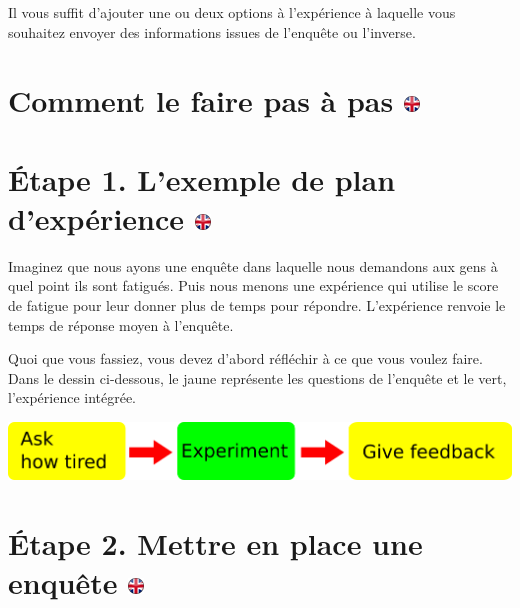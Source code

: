 \documentclass[
]{book}
\begin{document}
Il vous suffit d'ajouter une ou deux options à l'expérience à laquelle vous souhaitez envoyer des informations issues de l'enquête ou l'inverse.

\hypertarget{comment-le-faire-pas-uxe0-pas}{%
\section[Comment le faire pas à pas ]{\texorpdfstring{Comment le faire pas à pas \href{https://www.psytoolkit.org/lessons/var_in_out.html\#_how_to_do_it_step_by_step}{\protect\includegraphics{img/ukflag.png}}}{Comment le faire pas à pas }}\label{comment-le-faire-pas-uxe0-pas}}

\hypertarget{uxe9tape-1.-lexemple-de-plan-dexpuxe9rience}{%
\section[Étape 1. L'exemple de plan d'expérience ]{\texorpdfstring{Étape 1. L'exemple de plan d'expérience \href{https://www.psytoolkit.org/lessons/var_in_out.html\#_step_1_the_example_experimental_design}{\protect\includegraphics{img/ukflag.png}}}{Étape 1. L'exemple de plan d'expérience }}\label{uxe9tape-1.-lexemple-de-plan-dexpuxe9rience}}

Imaginez que nous ayons une enquête dans laquelle nous demandons aux gens à quel point ils sont fatigués. Puis nous menons une expérience qui utilise le score de fatigue pour leur donner plus de temps pour répondre. L'expérience renvoie le temps de réponse moyen à l'enquête.

Quoi que vous fassiez, vous devez d'abord réfléchir à ce que vous voulez faire. Dans le dessin ci-dessous, le jaune représente les questions de l'enquête et le vert, l'expérience intégrée.

\includegraphics{img/design_var_in_out.png}

\hypertarget{uxe9tape-2.-mettre-en-place-une-enquuxeate}{%
\section[Étape 2. Mettre en place une enquête ]{\texorpdfstring{Étape 2. Mettre en place une enquête \href{https://www.psytoolkit.org/lessons/var_in_out.html\#_step_2_setup_a_survey}{\protect\includegraphics{img/ukflag.png}}}{Étape 2. Mettre en place une enquête }}\label{uxe9tape-2.-mettre-en-place-une-enquuxeate}}
\end{document}
